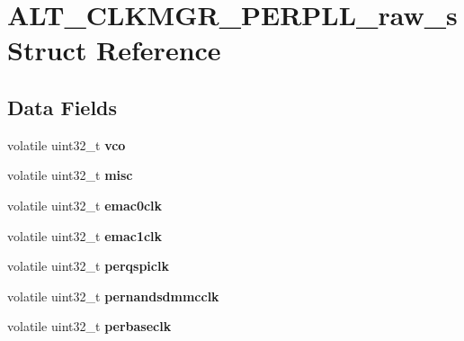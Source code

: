 \hypertarget{structALT__CLKMGR__PERPLL__raw__s}{}\section{A\+L\+T\+\_\+\+C\+L\+K\+M\+G\+R\+\_\+\+P\+E\+R\+P\+L\+L\+\_\+raw\+\_\+s Struct Reference}
\label{structALT__CLKMGR__PERPLL__raw__s}
\subsection*{Data Fields}
\begin{DoxyCompactItemize}
\item 
\mbox{\label{structALT__CLKMGR__PERPLL__raw__s_a6ecc1c6c22b2d02d42e4be77fe9173d9}} 
volatile uint32\+\_\+t {\bfseries vco}
\item 
\mbox{\label{structALT__CLKMGR__PERPLL__raw__s_a91f58d881307e9ce5c7604ec9ec01699}} 
volatile uint32\+\_\+t {\bfseries misc}
\item 
\mbox{\label{structALT__CLKMGR__PERPLL__raw__s_a2fab98e68b647dadeb4980081c5619a4}} 
volatile uint32\+\_\+t {\bfseries emac0clk}
\item 
\mbox{\label{structALT__CLKMGR__PERPLL__raw__s_af352af0fe7a11970fb43beaef5eff45a}} 
volatile uint32\+\_\+t {\bfseries emac1clk}
\item 
\mbox{\label{structALT__CLKMGR__PERPLL__raw__s_ae91bae31fb093ac4db61cb9756e987f5}} 
volatile uint32\+\_\+t {\bfseries perqspiclk}
\item 
\mbox{\label{structALT__CLKMGR__PERPLL__raw__s_ad5448a1341a53403607966e7c4b59ec7}} 
volatile uint32\+\_\+t {\bfseries pernandsdmmcclk}
\item 
\mbox{\label{structALT__CLKMGR__PERPLL__raw__s_a7de0aea221215a4e700f930bcdae8bb0}} 
volatile uint32\+\_\+t {\bfseries perbaseclk}
\item 
\mbox{\label{structALT__CLKMGR__PERPLL__raw__s_aaafca46d73f2480e63386c9fb3cd85bd}} 

\end{DoxyCompactItemize}
